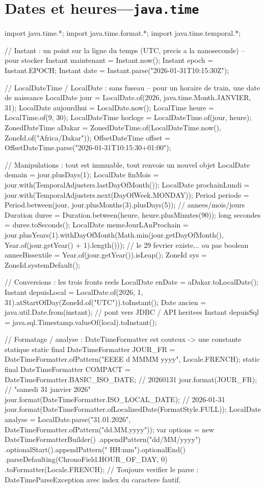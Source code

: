 \section{Dates et heures---\texttt{java.time}}

\begin{codejava}
import java.time.*;
import java.time.format.*;
import java.time.temporal.*;

// Instant : un point sur la ligne du temps (UTC, precis a la nanoseconde) -- pour stocker
Instant maintenant = Instant.now();
Instant epoch = Instant.EPOCH;
Instant date = Instant.parse("2026-01-31T10:15:30Z");

// LocalDateTime / LocalDate : sans fuseau -- pour un horaire de train, une date de naissance
LocalDate jour = LocalDate.of(2026, java.time.Month.JANVIER, 31);
LocalDate aujourdhui = LocalDate.now();
LocalTime heure = LocalTime.of(9, 30);
LocalDateTime horloge = LocalDateTime.of(jour, heure);
ZonedDateTime aDakar = ZonedDateTime.of(LocalDateTime.now(), ZoneId.of("Africa/Dakar"));
OffsetDateTime offset = OffsetDateTime.parse("2026-01-31T10:15:30+01:00");

// Manipulations : tout est immuable, tout renvoie un nouvel objet
LocalDate demain = jour.plusDays(1);
LocalDate finMois = jour.with(TemporalAdjusters.lastDayOfMonth());
LocalDate prochainLundi = jour.with(TemporalAdjusters.next(DayOfWeek.MONDAY));
Period periode = Period.between(jour, jour.plusMonths(3).plusDays(5));   // annees/mois/jours
Duration duree = Duration.between(heure, heure.plusMinutes(90));
long secondes = duree.toSeconds();
LocalDate memeJourLAnProchain = jour.plusYears(1).withDayOfMonth(Math.min(jour.getDayOfMonth(),
        Year.of(jour.getYear() + 1).length()));      // le 29 fevrier existe... ou pas
boolean anneeBissextile = Year.of(jour.getYear()).isLeap();
ZoneId sys = ZoneId.systemDefault();

// Conversions : les trois fronts reels
LocalDate enDate = aDakar.toLocalDate();
Instant depuisLocal = LocalDate.of(2026, 1, 31).atStartOfDay(ZoneId.of("UTC")).toInstant();
Date ancien = java.util.Date.from(instant);                    // pont vers JDBC / API heritees
Instant depuisSql = java.sql.Timestamp.valueOf(local).toInstant();

// Formatage / analyse : DateTimeFormatter est couteux -> une constante statique
static final DateTimeFormatter JOUR_FR = DateTimeFormatter.ofPattern("EEEE d MMMM yyyy", Locale.FRENCH);
static final DateTimeFormatter COMPACT = DateTimeFormatter.BASIC_ISO_DATE;        // 20260131
jour.format(JOUR_FR);                              // "samedi 31 janvier 2026"
jour.format(DateTimeFormatter.ISO_LOCAL_DATE);       // 2026-01-31
jour.format(DateTimeFormatter.ofLocalizedDate(FormatStyle.FULL));
LocalDate analyse = LocalDate.parse("31.01.2026", DateTimeFormatter.ofPattern("dd.MM.yyyy"));
var options = new DateTimeFormatterBuilder()
        .appendPattern("dd/MM/yyyy")
        .optionalStart().appendPattern(" HH:mm").optionalEnd()
        .parseDefaulting(ChronoField.HOUR_OF_DAY, 0)
        .toFormatter(Locale.FRENCH);
// Toujours verifier le parse : DateTimeParseException avec index du caractere fautif.
\end{codejava}

